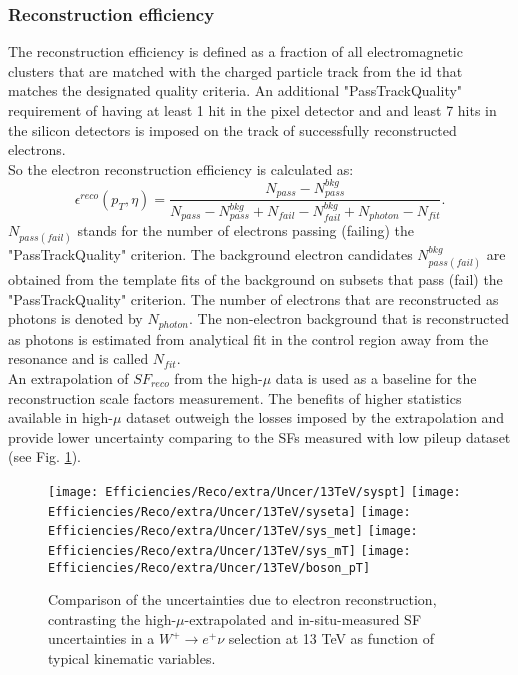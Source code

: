     \subsubsection{Reconstruction efficiency}
    The reconstruction efficiency is defined as a fraction of all electromagnetic clusters that are matched with the charged particle track from the \gls{id} that matches the designated quality criteria. An additional "PassTrackQuality" requirement of having at least 1 hit in the pixel detector and and least 7 hits in the silicon detectors is imposed on the track of successfully reconstructed electrons. \\
    So the electron reconstruction efficiency is calculated as:
    \begin{equation}
    \label{eq:eff_reco}
    \epsilon^{reco}(p_T,\eta)=\frac{N_{pass}-N_{pass}^{bkg}}{N_{pass}-N_{pass}^{bkg}+N_{fail}-N_{fail}^{bkg}+N_{photon}-N_{fit}}.
    \end{equation}
    $N_{pass(fail)}$ stands for the number of electrons passing (failing) the "PassTrackQuality" criterion. The background electron candidates $N^{bkg}_{pass(fail)}$ are obtained from the template fits of the background on subsets that pass (fail) the "PassTrackQuality" criterion. The number of electrons that are reconstructed as photons is denoted by $N_{photon}$. The non-electron background that is reconstructed as photons is estimated from analytical fit in the control region away from the \Zee resonance and is called $N_{fit}$.\\
    An extrapolation of $SF_{reco}$ from the high-$\mu$ data is used as a baseline for the reconstruction scale factors measurement. The benefits of higher statistics available in high-$\mu$ dataset outweigh the losses imposed by the extrapolation and provide lower uncertainty comparing to the SFs measured with low pileup dataset (see Fig. \ref{fig:extra_sys_13_medium}).
    \begin{figure}[htbp]
    	\begin{center}
    		\texttt{[image: Efficiencies/Reco/extra/Uncer/13TeV/syspt]}
    		\texttt{[image: Efficiencies/Reco/extra/Uncer/13TeV/syseta]}
    		\texttt{[image: Efficiencies/Reco/extra/Uncer/13TeV/sys\_met]}
    		\texttt{[image: Efficiencies/Reco/extra/Uncer/13TeV/sys\_mT]}
    	     \texttt{[image: Efficiencies/Reco/extra/Uncer/13TeV/boson\_pT]}
    		\caption{Comparison of the uncertainties due to electron
    			reconstruction, contrasting the high-$\mu$-extrapolated and
    			in-situ-measured SF uncertainties in a $W^{+}\rightarrow
    			e^{+}\nu$ selection at 13 TeV as function of typical kinematic variables.}
    		\label{fig:extra_sys_13_medium}
    	\end{center}
    \end{figure}
    \clearpage
